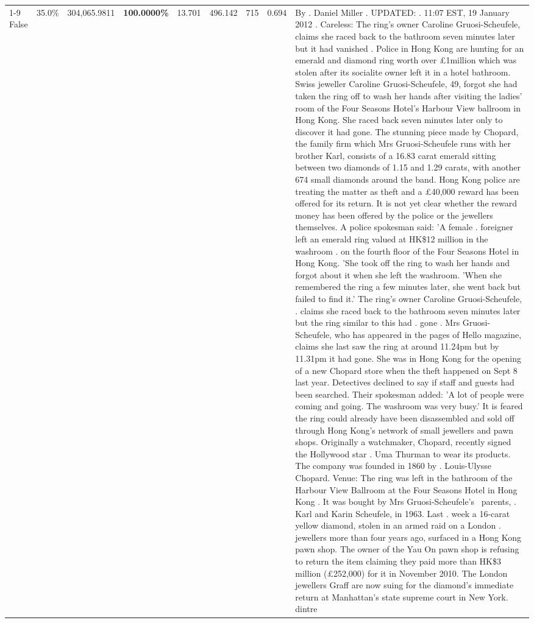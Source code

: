 \begin{table}[H]
\begin{tabular}{lllrlllll}
\cline{1-9}
False & 35.0\% & \color{red} 304,065.9811 & \bfseries \color{red} 100.0000\% & 13.701 & 496.142 & 715 & 0.694 & By . Daniel Miller . UPDATED: . 11:07 EST, 19 January 2012 . Careless: The ring's owner Caroline Gruosi-Scheufele, claims she raced back to the bathroom seven minutes later but it had vanished . Police in Hong Kong are hunting for an emerald and diamond ring worth over £1million which was stolen after its socialite owner left it in a hotel bathroom. Swiss jeweller Caroline Gruosi-Scheufele, 49, forgot she had taken the ring off to wash her hands after visiting the ladies' room of the Four Seasons Hotel's Harbour View ballroom in Hong Kong. She raced back seven minutes later only to discover it had gone. The stunning piece made by Chopard, the family firm which Mrs Gruosi-Scheufele runs with her brother Karl, consists of a 16.83 carat emerald sitting between two diamonds of 1.15 and 1.29 carats, with another 674 small diamonds around the band. Hong Kong police are treating the matter as theft and a £40,000 reward has been offered for its return. It is not yet clear whether the reward money has been offered by the police or the jewellers themselves. A police spokesman said: 'A female . foreigner left an emerald ring valued at HK\$12 million in the washroom . on the fourth floor of the Four Seasons Hotel in Hong Kong. 'She took off the ring to wash her hands and forgot about it when she left the washroom. 'When she remembered the ring a few minutes later, she went back but failed to find it.' The ring's owner Caroline Gruosi-Scheufele, . claims she raced back to the bathroom seven minutes later but the ring similar to this had . gone . Mrs Gruosi-Scheufele, who has appeared in the pages of Hello magazine, claims she last saw the ring at around 11.24pm but by 11.31pm it had gone. She was in Hong Kong for the opening of a new Chopard store when the theft happened on Sept 8 last year. Detectives declined to say if staff and guests had been searched. Their spokesman added: 'A lot of people were coming and going. The washroom was very busy.' It is feared the ring could already have been disassembled and sold off through Hong Kong's network of small jewellers and pawn shops. Originally a watchmaker, Chopard, recently signed the Hollywood star . Uma Thurman to wear its products. The company was founded in 1860 by . Louis-Ulysse Chopard. Venue: The ring was left in the bathroom of the Harbour View Ballroom at the Four Seasons Hotel in Hong Kong . It was bought by Mrs Gruosi-Scheufele's  parents, . Karl and Karin Scheufele, in 1963. Last . week a 16-carat yellow diamond, stolen in an armed raid on a London . jewellers more than four years ago, surfaced in a Hong Kong pawn shop. The owner of the Yau On pawn shop is refusing to return the item claiming they paid more than HK\$3 million (£252,000) for it in November 2010. The London jewellers Graff are now suing for the diamond’s immediate return at Manhattan’s state supreme court in New York. dintre \\

\end{tabular}
\end{table}
